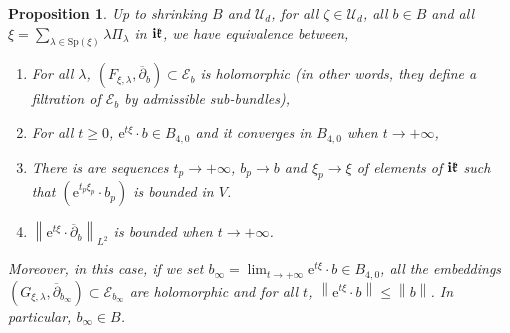 \documentclass{article}
\newtheorem{proposition}[theorem]{Proposition}
\theoremstyle{remark}
\theoremstyle{definition}
\renewcommand{\i}{\boldsymbol{\mathrm{i}}}
\newcommand{\e}{\boldsymbol{\mathrm{e}}}
\newcommand{\norme}[1]{\left\| #1 \right\|}
\newcommand{\E}{\mathcal{E}}
\newcommand{\mU}{\mathcal{U}}
\newcommand{\dbar}{\overline{\partial}}
\renewcommand{\leq}{\leqslant}
\renewcommand{\geq}{\geqslant}
\begin{document}
\begin{proposition}\label{PRO:Convergence exp(txi)b}
    Up to shrinking $B$ and $\mU_d$, for all $\zeta \in \mU_d$, all $b \in B$ and all $\xi = \sum_{\lambda \in \mathrm{Sp}(\xi)} \lambda\Pi_\lambda$ in $\i\frak{k}$, we have equivalence between,
    \begin{enumerate}
        \item For all $\lambda$, $(F_{\xi,\lambda},\dbar_b) \subset \E_b$ is holomorphic (in other words, they define a filtration of $\E_b$ by admissible sub-bundles),
        \item For all $t \geq 0$, $\e^{t\xi} \cdot b \in B_{4,0}$ and it converges in $B_{4,0}$ when $t \rightarrow +\infty$,
        \item There is are sequences $t_p \rightarrow +\infty$, $b_p \rightarrow b$ and $\xi_p \rightarrow \xi$ of elements of $\i\frak{k}$ such that $(\e^{t_p\xi_p} \cdot b_p)$ is bounded in $V$.
        \item $\norme{\e^{t\xi} \cdot \dbar_b}_{L^2}$ is bounded when $t \rightarrow +\infty$.
    \end{enumerate}
    Moreover, in this case, if we set $b_\infty = \lim_{t \rightarrow +\infty} \e^{t\xi} \cdot b \in B_{4,0}$, all the embeddings $(G_{\xi,\lambda},\dbar_{b_\infty}) \subset \E_{b_\infty}$ are holomorphic and for all $t$, $\norme{\e^{t\xi} \cdot b} \leq \norme{b}$. In particular, $b_\infty \in B$.
\end{proposition}
\end{document}
